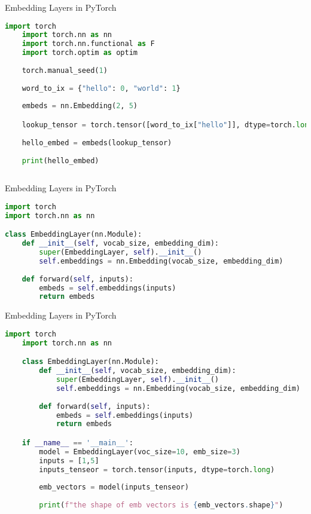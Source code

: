 \begin{frame}[fragile]{Embedding Layers in PyTorch}
    \tiny
     \begin{lstlisting}[language=Python]
    import torch
    import torch.nn as nn
    import torch.nn.functional as F
    import torch.optim as optim
    
    torch.manual_seed(1)
    
    word_to_ix = {"hello": 0, "world": 1}
    
    embeds = nn.Embedding(2, 5) 

    lookup_tensor = torch.tensor([word_to_ix["hello"]], dtype=torch.long)
    
    hello_embed = embeds(lookup_tensor)
    
    print(hello_embed)
    
    \end{lstlisting}
\end{frame}
 
 \begin{frame}[fragile]{Embedding Layers in PyTorch}
  \tiny
     \begin{lstlisting}[language=Python]
import torch
import torch.nn as nn

class EmbeddingLayer(nn.Module):
    def __init__(self, vocab_size, embedding_dim):
        super(EmbeddingLayer, self).__init__()
        self.embeddings = nn.Embedding(vocab_size, embedding_dim)
    
    def forward(self, inputs):
        embeds = self.embeddings(inputs)
        return embeds
\end{lstlisting}        

\end{frame}
 
\begin{frame}[fragile]{Embedding Layers in PyTorch}
  \tiny
     \begin{lstlisting}[language=Python]
    import torch
    import torch.nn as nn

    class EmbeddingLayer(nn.Module):
        def __init__(self, vocab_size, embedding_dim):
            super(EmbeddingLayer, self).__init__()
            self.embeddings = nn.Embedding(vocab_size, embedding_dim)
        
        def forward(self, inputs):
            embeds = self.embeddings(inputs)
            return embeds

    if __name__ == '__main__':
        model = EmbeddingLayer(voc_size=10, emb_size=3)
        inputs = [1,5]
        inputs_tenseor = torch.tensor(inputs, dtype=torch.long)
        
        emb_vectors = model(inputs_tenseor)
        
        print(f"the shape of emb vectors is {emb_vectors.shape}")            
    \end{lstlisting}
\end{frame}

